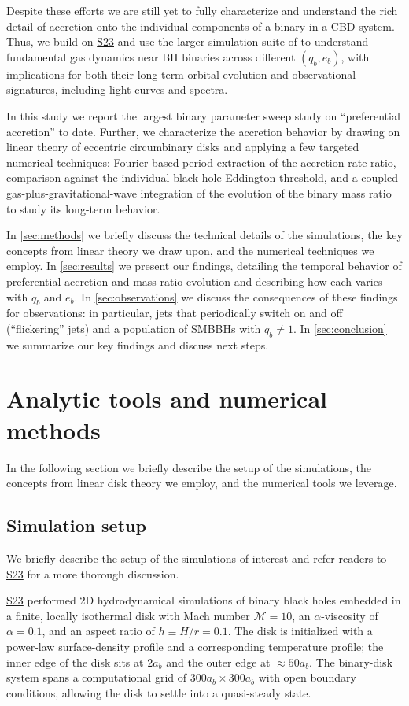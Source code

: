 \documentclass[fleqn,usenatbib]{mnras}
\newcommand{\Stwentythree}{\href{https://doi.org/10.1093/mnras/stac3263}{S23}\xspace}
\begin{document}
Despite these efforts we are still yet to fully characterize and understand the rich detail of accretion onto the individual components of a binary in a CBD system. Thus, we build on \Stwentythree and use the larger simulation suite of \citealt{siwek_cbdorbevol} to understand fundamental gas dynamics near BH binaries across different $(q_b, e_b)$, with implications for both their long-term orbital evolution and observational signatures, including light-curves and spectra.

In this study we report the largest binary parameter sweep study on ``preferential accretion'' to date. Further, we characterize the accretion behavior by drawing on linear theory of eccentric circumbinary disks and applying a few targeted numerical techniques: Fourier-based period extraction of the accretion rate ratio, comparison against the individual black hole Eddington threshold, and a coupled gas-plus-gravitational-wave integration of the evolution of the binary mass ratio to study its long-term behavior.

In \autoref{sec:methods} we briefly discuss the technical details of the simulations, the key concepts from linear theory we draw upon, and the numerical techniques we employ. In \autoref{sec:results} we present our findings, detailing the temporal behavior of preferential accretion and mass-ratio evolution and describing how each varies with $q_b$ and $e_b$. In \autoref{sec:observations} we discuss the consequences of these findings for observations: in particular, jets that periodically switch on and off (``flickering'' jets) and a population of SMBBHs with $q_b \neq 1$. In \autoref{sec:conclusion} we summarize our key findings and discuss next steps.


\section{Analytic tools and numerical methods}\label{sec:methods}
In the following section we briefly describe the setup of the \citet{siwek_prefacc, siwek_cbdorbevol} simulations, the concepts from linear disk theory we employ, and the numerical tools we leverage.
\subsection{Simulation setup}
We briefly describe the setup of the simulations of interest and refer readers to \Stwentythree for a more thorough discussion.

\Stwentythree performed 2D hydrodynamical simulations of binary black holes embedded in a finite, locally isothermal disk with Mach number $\mathcal{M}=10$, an $\alpha$-viscosity of $\alpha=0.1$, and an aspect ratio of $h\equiv H/r=0.1$. The disk is initialized with a power-law surface-density profile and a corresponding temperature profile; the inner edge of the disk sits at $2a_b$ and the outer edge at $\approx 50a_b$. The binary-disk system spans a computational grid of $300 a_b \times 300a_b$ with open boundary conditions, allowing the disk to settle into a quasi-steady state.
\end{document}
